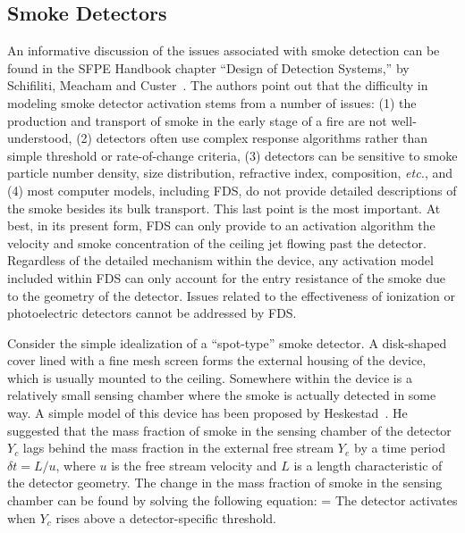 \documentclass[11pt]{book}
\begin{document}
\subsection{Smoke Detectors}

An informative discussion of the issues associated with smoke detection can be found in the
SFPE Handbook chapter ``Design of Detection Systems,'' by Schifiliti, Meacham and Custer~\cite{SFPE}.
The authors point out that the difficulty in modeling smoke detector activation stems from a number of issues:
(1) the production and transport of smoke in the early stage of a fire are not well-understood, (2) detectors often use
complex response algorithms rather than simple threshold or rate-of-change criteria, (3) detectors can be sensitive
to smoke particle number density, size distribution, refractive index, composition, {\em etc.}, and (4) most
computer models, including FDS, do not provide detailed descriptions of the smoke besides its bulk transport. This
last point is the most important. At best, in its present form, FDS can only provide to an activation algorithm the
velocity and smoke concentration of the ceiling jet flowing past the detector. Regardless of the
detailed mechanism within
the device, any activation model included within FDS can only account for the entry resistance of the smoke due to the
geometry of the detector. Issues related to the effectiveness of ionization or photoelectric detectors cannot be
addressed by FDS.

Consider the simple idealization of a ``spot-type'' smoke detector. A disk-shaped cover lined with a fine mesh screen
forms the external housing of the device, which is usually mounted to the ceiling.
Somewhere within the device is a relatively small sensing chamber where the smoke is actually detected in some way.
A simple model of this device has been proposed by Heskestad~\cite{SFPE}. He suggested that the mass fraction of smoke in the
sensing chamber of the detector $Y_c$ lags behind the mass fraction in the
external free stream $Y_e$ by a time period $\delta t = L/u$,
where $u$ is the free stream velocity and $L$ is a length characteristic of the detector geometry.
The change in the mass fraction of smoke in the sensing chamber can be found by solving the following equation:
\be {} =  \label{HYoeq} \ee
The detector activates when $Y_c$ rises above a detector-specific threshold.
\end{document}
